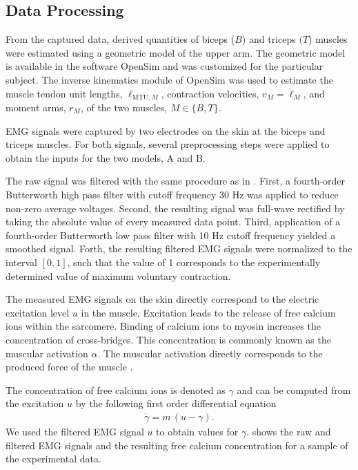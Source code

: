 \subsection{Data Processing}
From the captured data, derived quantities of biceps ($B$) and triceps $(T$) muscles were estimated using a geometric model of the upper arm. 
The geometric model is available in the software OpenSim \cite{OpenSim2007} and was customized for the particular subject. The inverse kinematics module of OpenSim was used to estimate the muscle tendon unit lengths, $\ell_{\text{MTU},M}$, contraction velocities, $v_M=\dot{\ell}_M$, and moment arms, $r_{M}$, of the two muscles, $M\in\{B,T\}$.

EMG signals were captured by two electrodes on the skin at the biceps and triceps muscles. For both signals, several preprocessing steps were applied to obtain the inputs for the two models, A and B.

The raw signal was filtered with the same procedure as in \cite{Falisse2016}. First, a fourth-order Butterworth high pass filter with cutoff frequency 30 Hz was applied to reduce non-zero average voltages. Second, the resulting signal was full-wave rectified by taking the absolute value of every measured data point. Third, application of a fourth-order Butterworth low pass filter with 10 Hz cutoff frequency yielded a smoothed signal.
Forth, the resulting filtered EMG signals were normalized to the interval $[0,1]$, such that the value of 1 corresponds to the experimentally determined value of maximum voluntary contraction.

The measured EMG signals on the skin directly correspond to the electric excitation level $u$ in the muscle. Excitation leads to the release of free calcium ions within the sarcomere. Binding of calcium ions to myosin increases the concentration of cross-bridges. This concentration is commonly known as the muscular activation $\alpha$. The muscular activation directly corresponds to the produced force of the muscle \cite{Bayer2017}.

The concentration of free calcium ions is denoted as $\gamma$ and can be computed from the excitation $u$ by the following first order differential equation \cite{Hatze1977}
%
\begin{equation*}
  \begin{array}{lll}
    \dot{\gamma} = m\,(u - \gamma).
  \end{array}
\end{equation*}
%
We used the filtered EMG signal $u$ to obtain values for $\gamma$.  shows the raw and filtered EMG signals and the resulting free calcium concentration for a sample of the experimental data.

